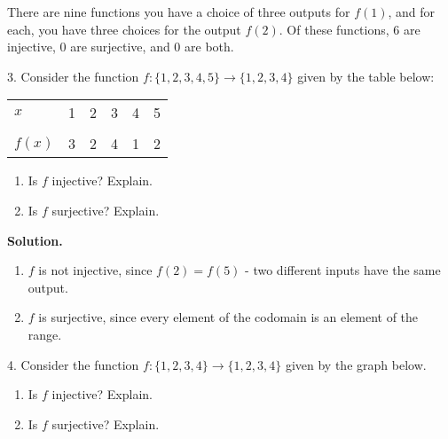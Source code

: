 \documentclass[10pt,]{book}
\theoremstyle{plain}
\theoremstyle{definition}
\theoremstyle{definition}
\theoremstyle{definition}
\newcommand{\hrulethin}  {\noalign{\hrule height 0.04em}}
\begin{document}
\begin{exerciselist}
            There are nine functions \textendash{} you have a choice of three outputs for \(f(1)\), and for each, you have three choices for the output \(f(2)\). Of these functions, 6 are injective, 0 are surjective, and 0 are both.
\item[3.]\hypertarget{exercise-29}{}
            Consider the function \(f:\{1,2,3,4,5\} \to \{1,2,3,4\}\) given by the table below:
\begin{tabular}{llllll}
\(x\)&1&2&3&4&5\tabularnewline[0pt]
&&&&&\tabularnewline\hrulethin
\(f(x)\)&3&2&4&1&2
\end{tabular}
\leavevmode%
\begin{enumerate}[label=(\alph*)]
\item\hypertarget{li-299}{}
                Is \(f\) injective? Explain.
\item\hypertarget{li-300}{}
                Is \(f\) surjective? Explain.
\end{enumerate}
\par\smallskip
\par\smallskip
\noindent\textbf{Solution.}\hypertarget{solution-47}{}\quad
\leavevmode%
\begin{enumerate}[label=(\alph*)]
\item\hypertarget{li-301}{}\(f\) is not injective, since \(f(2) = f(5)\) - two different inputs have the same output.\item\hypertarget{li-302}{}\(f\) is surjective, since every element of the codomain is an element of the range.\end{enumerate}
\item[4.]\hypertarget{exercise-30}{}
            Consider the function \(f:\{1,2,3,4\} \to \{1,2,3,4\}\) given by the graph below.
{
}
\leavevmode%
\begin{enumerate}[label=(\alph*)]
\item\hypertarget{li-303}{}
                Is \(f\) injective? Explain.
\item\hypertarget{li-304}{}
                Is \(f\) surjective? Explain.

\end{enumerate}
\end{exerciselist}
\end{document}
